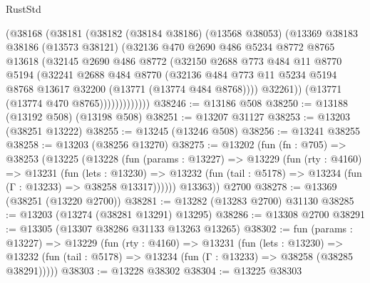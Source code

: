 \begin{lexlean}{RustStd}
\begin{coremodule}
                (@38168
                  (@38181
                    (@38182
                      (@38184 @38186)
                      (@13568 @38053)
                      (@13369
                        @38183
                        @38186
                        (@13573 @38121)
                        (@32136
                          @470
                          @2690
                          @486
                          @5234
                          @8772
                          @8765
                          @13618
                          (@32145
                            @2690
                            @486
                            @8772
                            (@32150
                              @2688
                              @773
                              @484
                              @11
                              @8770
                              @5194
                              (@32241
                                @2688
                                @484
                                @8770
                                (@32136
                                  @484
                                  @773
                                  @11
                                  @5234
                                  @5194
                                  @8768
                                  @13617
                                  @32200
                                  (@13771 (@13774 @484 @8768))))
                              @32261))
                          (@13771 (@13774 @470 @8765)))))))))))))
@38246 := @13186 @508
@38250 := @13188 (@13192 @508) (@13198 @508)
@38251 := @13207 @31127
@38253 := @13203 (@38251 @13222)
@38255 := @13245 (@13246 @508)
@38256 := @13241 @38255
@38258 := @13203 (@38256 @13270)
@38275 := @13202
    (fun (fn : @705) =>
    @38253
      (@13225
        (@13228
          (fun (params : @13227) =>
          @13229
            (fun (rty : @4160) =>
            @13231
              (fun (lets : @13230) =>
              @13232 (fun (tail : @5178) => @13234 (fun (Γ : @13233) => @38258 @13317))))))
        @13363))
    @2700
@38278 := @13369 (@38251 (@13220 @2700))
@38281 := @13282 (@13283 @2700) @31130
@38285 := @13203 (@13274 (@38281 @13291) @13295)
@38286 := @13308 @2700
@38291 := @13305 (@13307 @38286 @31133 @13263 @13265)
@38302 := fun (params : @13227) =>
  @13229
    (fun (rty : @4160) =>
    @13231
      (fun (lets : @13230) =>
      @13232 (fun (tail : @5178) => @13234 (fun (Γ : @13233) => @38258 (@38285 @38291)))))
@38303 := @13228 @38302
@38304 := @13225 @38303

\end{coremodule}
\end{lexlean}
